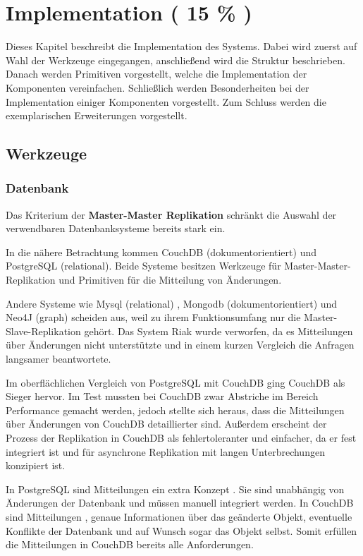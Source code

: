 \chapter{Implementation ( 15 \% ) }

Dieses Kapitel beschreibt die Implementation des Systems.
Dabei wird zuerst auf Wahl der Werkzeuge eingegangen,
anschließend wird die Struktur beschrieben.
Danach werden Primitiven vorgestellt, welche die Implementation der Komponenten vereinfachen.
Schließlich werden Besonderheiten bei der Implementation einiger Komponenten vorgestellt.
Zum Schluss werden die exemplarischen Erweiterungen vorgestellt.

\section{Werkzeuge}
\subsection{Datenbank}

Das Kriterium der \textbf{Master-Master Replikation}
schränkt die Auswahl der verwendbaren Datenbanksysteme bereits stark ein.

In die nähere Betrachtung kommen CouchDB \cite{couchdb:website} (dokumentorientiert)
und PostgreSQL \cite{postgresql:website} (relational).
Beide Systeme besitzen Werkzeuge für Master-Master-Replikation
und Primitiven für die Mitteilung von Änderungen.

Andere Systeme wie Mysql (relational) \cite{mysql:website}, Mongodb (dokumentorientiert) \cite{mongodb:website}
und  Neo4J (graph) \cite{neo4j:website} scheiden aus, weil zu ihrem Funktionsumfang
nur die Master-Slave-Replikation geh\"ort.
Das System Riak \cite{riak:website} wurde verworfen, da es Mitteilungen über Änderungen nicht unterstützte und in einem kurzen Vergleich
die Anfragen langsamer beantwortete.

Im oberflächlichen Vergleich von PostgreSQL mit CouchDB ging CouchDB als Sieger hervor.
Im Test mussten bei CouchDB zwar Abstriche im Bereich Performance gemacht werden,
jedoch stellte sich heraus, dass die Mitteilungen über Änderungen von CouchDB detaillierter sind.
Außerdem erscheint der Prozess der Replikation in CouchDB als fehlertoleranter und einfacher, da er fest integriert ist und für asynchrone Replikation mit langen Unterbrechungen konzipiert ist.

In PostgreSQL sind Mitteilungen ein extra Konzept \cite{postgresql:notify}.
Sie sind unabhängig von Änderungen der Datenbank und müssen manuell integriert werden. 
In CouchDB sind Mitteilungen \cite[Chap Notifications]{couchdb:guide}, genaue Informationen
über das geänderte Objekt, eventuelle Konflikte der Datenbank
und auf Wunsch sogar das Objekt selbst. Somit erfüllen die Mitteilungen in CouchDB bereits alle Anforderungen.

